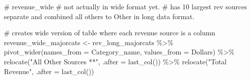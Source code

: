 \documentclass[
  letterpaper,
  DIV=11,
  numbers=noendperiod]{scrreport}
\newenvironment{Shaded}{\begin{snugshade}}{\end{snugshade}}
\newcommand{\AttributeTok}[1]{\textcolor[rgb]{0.40,0.45,0.13}{#1}}
\newcommand{\CommentTok}[1]{\textcolor[rgb]{0.37,0.37,0.37}{#1}}
\newcommand{\FunctionTok}[1]{\textcolor[rgb]{0.28,0.35,0.67}{#1}}
\newcommand{\NormalTok}[1]{\textcolor[rgb]{0.00,0.23,0.31}{#1}}
\newcommand{\OtherTok}[1]{\textcolor[rgb]{0.00,0.23,0.31}{#1}}
\newcommand{\SpecialCharTok}[1]{\textcolor[rgb]{0.37,0.37,0.37}{#1}}
\newcommand{\StringTok}[1]{\textcolor[rgb]{0.13,0.47,0.30}{#1}}
\begin{document}
\begin{Shaded}
\begin{Highlighting}[]
\CommentTok{\# revenue\_wide \# not actually in wide format yet. }
\CommentTok{\# has 10 largest rev sources separate and combined all others to Other in long data format. }


\CommentTok{\# creates wide version of table where each revenue source is a column}
\NormalTok{revenue\_wide\_majorcats }\OtherTok{\textless{}{-}}\NormalTok{ rev\_long\_majorcats }\SpecialCharTok{\%\textgreater{}\%} \FunctionTok{pivot\_wider}\NormalTok{(}\AttributeTok{names\_from =}\NormalTok{ Category\_name, }
              \AttributeTok{values\_from =}\NormalTok{ Dollars) }\SpecialCharTok{\%\textgreater{}\%}
  \FunctionTok{relocate}\NormalTok{(}\StringTok{"All Other Sources **"}\NormalTok{, }\AttributeTok{.after =} \FunctionTok{last\_col}\NormalTok{()) }\SpecialCharTok{\%\textgreater{}\%}
  \FunctionTok{relocate}\NormalTok{(}\StringTok{"Total Revenue"}\NormalTok{, }\AttributeTok{.after =}  \FunctionTok{last\_col}\NormalTok{())}



\end{Highlighting}
\end{Shaded}
\end{document}
